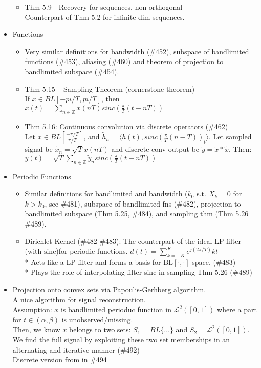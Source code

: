 \documentclass{article}
\newcommand{\cg}{\color{gray}}
\newcommand{\fs}{\footnotesize}
\begin{document}
\begin{itemize}
\begin{itemize}
\item Thm 5.9 \-- Recovery for sequences, non-orthogonal \\
{\cg\fs Counterpart of Thm 5.2 for infinite-dim sequences.}
\end{itemize}
\item Functions
\begin{itemize}
	\item Very similar definitions for {\cg bandwidth (\#452), subspace of bandlimited functions (\#453), aliasing (\#460) and theorem of projection to bandlimited subspace (\#454).}
	\item Thm 5.15 -- Sampling Theorem (cornerstone theorem) \\
	{\cg\fs If $x\in BL[-pi/T, pi/T]$, then $x(t)=\sum\limits_{n\in \mathbb{Z}}x(nT) sinc(\frac{\pi}{T}(t-nT))$}
	\item Thm 5.16: Continuous convolution via discrete operators (\#462) \\
	{\cg\fs Let $x\in BL[\frac{-\pi/T}{\pi/T}]$, and $\tilde{h}_n=\langle h(t), sinc(\frac{\pi}{T}(n-T))_t\rangle$. Let sampled signal be $\tilde{x}_n=\sqrt{T}x(nT)$ and discrete conv output be $\tilde{y}=\tilde{x}\ast\tilde{x}$. Then: \\
	$y(t) = \sqrt{T}\sum_{n\in\mathbb{Z}}\tilde{y}_n sinc(\frac{\pi}{T}(t-nT))$}
\end{itemize}
\item Periodic Functions
\begin{itemize}
	\item Similar definitions for bandlimited and bandwidth ($k_0$ s.t. $X_k=0$ for $k>k_0$, see \#481), subspace of bandlimited fns (\#482), projection to bandlimited subspace (Thm 5.25, \#484), and sampling thm (Thm 5.26 \#489).
	\item Dirichlet Kernel (\#482-\#483): The counterpart of the ideal LP filter (with $\text{sinc}$)for periodic functions. 
	{\cg\fs
	$d(t)=\sum\limits_{k=-K}^K e^{j(2\pi/T)}kt$ \\
	* Acts like a LP filter and forms a basis for $\text{BL}[\cdot,\cdot]$ space. (\#483)\\
	* Plays the role of interpolating filter sinc in sampling Thm 5.26 (\#489)}
\end{itemize}
\item Projection onto convex sets via Papoulis-Gerhberg algorithm. \\
{\cg\fs A nice algorithm for signal reconstruction.\\
Assumption: $x$ is bandlimited perioduc function in $\mathcal{L}^2([0,1])$ where a part for $t\in(\alpha,\beta)$ is unobserved/missing.\\
Then, we know $x$ belongs to two sets: $S_1=BL\{\hdots\}$ and $S_2=\mathcal{L}^2([0,1])$.\\
We find the full signal by exploiting these two set memberships in an alternating and iterative manner (\#492)\\
Discrete version from in \#494}


\end{itemize}
\end{document}

